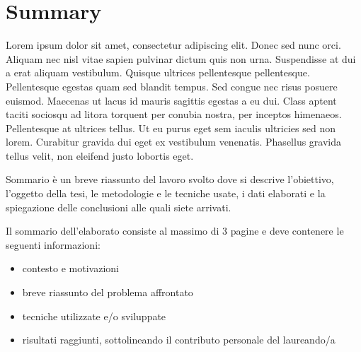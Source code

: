 \chapter*{Summary}
\label{sommario}


Lorem ipsum dolor sit amet, consectetur adipiscing elit. Donec sed nunc orci. Aliquam nec nisl vitae sapien pulvinar dictum quis non urna. Suspendisse at dui a erat aliquam vestibulum. Quisque ultrices pellentesque pellentesque. Pellentesque egestas quam sed blandit tempus. Sed congue nec risus posuere euismod. Maecenas ut lacus id mauris sagittis egestas a eu dui. Class aptent taciti sociosqu ad litora torquent per conubia nostra, per inceptos himenaeos. Pellentesque at ultrices tellus. Ut eu purus eget sem iaculis ultricies sed non lorem. Curabitur gravida dui eget ex vestibulum venenatis. Phasellus gravida tellus velit, non eleifend justo lobortis eget.


Sommario è un breve riassunto del lavoro svolto dove si descrive l'obiettivo, l'oggetto della tesi, le
metodologie e le tecniche usate, i dati elaborati e la spiegazione delle conclusioni alle quali siete arrivati.

Il sommario dell’elaborato consiste al massimo di 3 pagine e deve contenere le seguenti informazioni:
\begin{itemize}
  \item contesto e motivazioni
  \item breve riassunto del problema affrontato
  \item tecniche utilizzate e/o sviluppate
  \item risultati raggiunti, sottolineando il contributo personale del laureando/a
\end{itemize}




